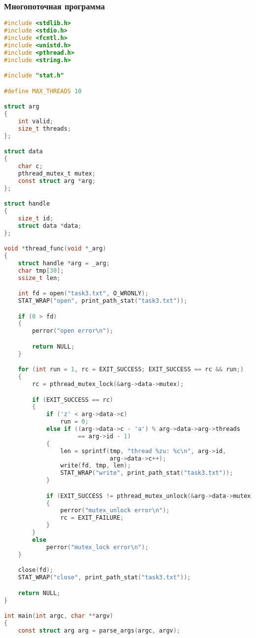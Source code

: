 \subsubsection{Многопоточная программа}

\begin{lstlisting}[language=c, caption={Третья программа 1 (многопоточный вариант)}]
#include <stdlib.h>
#include <stdio.h>
#include <fcntl.h>
#include <unistd.h>
#include <pthread.h>
#include <string.h>

#include "stat.h"

#define MAX_THREADS 10

struct arg
{
    int valid;
    size_t threads;
};

struct data
{
    char c;
    pthread_mutex_t mutex;
    const struct arg *arg;
};

struct handle
{
    size_t id;
    struct data *data;
};

void *thread_func(void *_arg)
{
    struct handle *arg = _arg;
    char tmp[30];
    ssize_t len;

    int fd = open("task3.txt", O_WRONLY);
    STAT_WRAP("open", print_path_stat("task3.txt"));

    if (0 > fd)
    {
        perror("open error\n");

        return NULL;
    }

    for (int run = 1, rc = EXIT_SUCCESS; EXIT_SUCCESS == rc && run;)
    {
        rc = pthread_mutex_lock(&arg->data->mutex);

        if (EXIT_SUCCESS == rc)
        {
            if ('z' < arg->data->c)
                run = 0;
            else if ((arg->data->c - 'a') % arg->data->arg->threads
                     == arg->id - 1)
            {
                len = sprintf(tmp, "thread %zu: %c\n", arg->id,
                              arg->data->c++);
                write(fd, tmp, len);
                STAT_WRAP("write", print_path_stat("task3.txt"));
            }

            if (EXIT_SUCCESS != pthread_mutex_unlock(&arg->data->mutex))
            {
                perror("mutex_unlock error\n");
                rc = EXIT_FAILURE;
            }
        }
        else
            perror("mutex_lock error\n");
    }

    close(fd);
    STAT_WRAP("close", print_path_stat("task3.txt"));

    return NULL;
}

int main(int argc, char **argv)
{
    const struct arg arg = parse_args(argc, argv);


\end{lstlisting}
